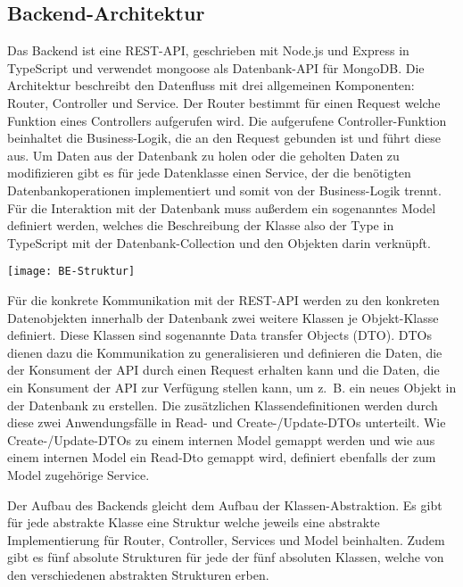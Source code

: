 \subsection{Backend-Architektur}
Das Backend ist eine REST-API, geschrieben mit Node.js und Express in TypeScript und verwendet mongoose als Datenbank-API für MongoDB. Die Architektur beschreibt den Datenfluss mit drei allgemeinen Komponenten: Router, Controller und Service.
Der Router bestimmt für einen Request welche Funktion eines Controllers aufgerufen wird. Die aufgerufene Controller-Funktion beinhaltet die Business-Logik, die an den Request gebunden ist und führt diese aus. Um Daten aus der Datenbank zu holen oder die geholten Daten zu modifizieren gibt es für jede Datenklasse einen Service, der die benötigten Datenbankoperationen implementiert und somit von der Business-Logik trennt. Für die Interaktion mit der Datenbank muss außerdem ein sogenanntes Model definiert werden, welches die Beschreibung der Klasse also der Type in TypeScript mit der Datenbank-Collection und den Objekten darin verknüpft.

\vspace{20pt}
\begin{center}
    \begin{minipage}{1\linewidth}
        \texttt{[image: BE-Struktur]}
    \end{minipage}
\end{center}
\vspace{20pt}

Für die konkrete Kommunikation mit der REST-API werden zu den konkreten Datenobjekten innerhalb der Datenbank zwei weitere Klassen je Objekt-Klasse definiert. Diese Klassen sind sogenannte Data transfer Objects (DTO). DTOs dienen dazu die Kommunikation zu generalisieren und definieren die Daten, die der Konsument der API durch einen Request erhalten kann und die Daten, die ein Konsument der API zur Verfügung stellen kann, um z. B. ein neues Objekt in der Datenbank zu erstellen. Die zusätzlichen Klassendefinitionen werden durch diese zwei Anwendungsfälle in Read- und Create-/Update-DTOs unterteilt. Wie Create-/Update-DTOs zu einem internen Model gemappt werden und wie aus einem internen Model ein Read-Dto gemappt wird, definiert ebenfalls der zum Model zugehörige Service.

Der Aufbau des Backends gleicht dem Aufbau der Klassen-Abstraktion. Es gibt für jede abstrakte Klasse eine Struktur welche jeweils eine abstrakte Implementierung für Router, Controller, Services und Model beinhalten.
Zudem gibt es fünf absolute Strukturen für jede der fünf absoluten Klassen, welche von den verschiedenen abstrakten Strukturen erben.

